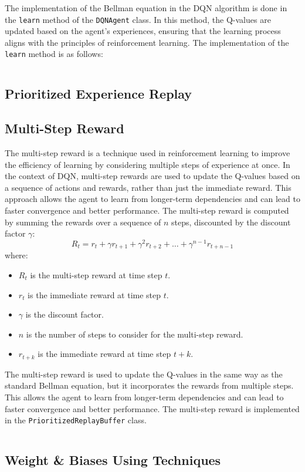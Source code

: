 The implementation of the Bellman equation in the DQN algorithm is done in the \texttt{learn} method of the \texttt{DQNAgent} class.
In this method, the Q-values are updated based on the agent's experiences, ensuring that the learning process aligns with the principles of reinforcement learning.
The implementation of the \texttt{learn} method is as follows:

\inputminted[firstline=135, highlightlines={152-159}]{python}{../dqn.py}

\subsection{Prioritized Experience Replay}
\label{sec:per}

\subsection{Multi-Step Reward}

The multi-step reward is a technique used in reinforcement learning to improve the efficiency of learning by considering multiple steps of experience at once.
In the context of DQN, multi-step rewards are used to update the Q-values based on a sequence of actions and rewards, rather than just the immediate reward.
This approach allows the agent to learn from longer-term dependencies and can lead to faster convergence and better performance.
The multi-step reward is computed by summing the rewards over a sequence of $n$ steps, discounted by the discount factor $\gamma$:
\begin{equation}
      R_t = r_t + \gamma r_{t+1} + \gamma^2 r_{t+2} + \ldots + \gamma^{n-1} r_{t+n-1}
\end{equation}
where:
\begin{itemize}
      \item $R_t$ is the multi-step reward at time step $t$.
      \item $r_t$ is the immediate reward at time step $t$.
      \item $\gamma$ is the discount factor.
      \item $n$ is the number of steps to consider for the multi-step reward.
      \item $r_{t+k}$ is the immediate reward at time step $t+k$.
\end{itemize}
The multi-step reward is used to update the Q-values in the same way as the standard Bellman equation, but it incorporates the rewards from multiple steps.
This allows the agent to learn from longer-term dependencies and can lead to faster convergence and better performance.
The multi-step reward is implemented in the \texttt{PrioritizedReplayBuffer} class.

\inputminted[firstline=20, lastline=82,highlightlines={53-60}]{python}{../dqn.py}

\subsection{Weight \& Biases Using Techniques}
